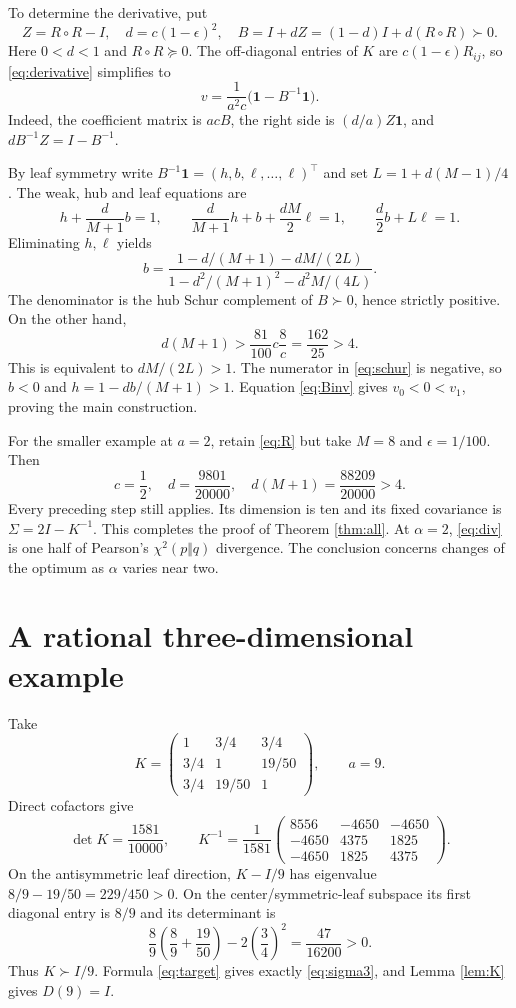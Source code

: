 \documentclass[11pt]{article}
\theoremstyle{remark}\newtheorem{remark}[theorem]{Remark}
\newcommand{\one}{\mathbf{1}}
\begin{document}
To determine the derivative, put
\[
 Z=R\circ R-I,\quad d=c(1-\epsilon)^2,\quad
 B=I+dZ=(1-d)I+d(R\circ R)\succ0.
\]
Here $0<d<1$ and $R\circ R\succeq0$. The off-diagonal entries of $K$
are $c(1-\epsilon)R_{ij}$, so \eqref{eq:derivative} simplifies to
\begin{equation}\label{eq:Binv}
 v=\frac1{a^2c}\bigl(\one-B^{-1}\one\bigr).
\end{equation}
Indeed, the coefficient matrix is $acB$, the right side is
$(d/a)Z\one$, and $dB^{-1}Z=I-B^{-1}$.

By leaf symmetry write
$B^{-1}\one=(h,b,\ell,\ldots,\ell)^\top$ and set
$L=1+d(M-1)/4$. The weak, hub and leaf equations are
\[
 h+\frac d{M+1}b=1,\qquad
 \frac d{M+1}h+b+\frac{dM}{2}\ell=1,\qquad
 \frac d2 b+L\ell=1.
\]
Eliminating $h,\ell$ yields
\begin{equation}\label{eq:schur}
 b=\frac{1-d/(M+1)-dM/(2L)}
          {1-d^2/(M+1)^2-d^2M/(4L)}.
\end{equation}
The denominator is the hub Schur complement of $B\succ0$, hence
strictly positive. On the other hand,
\[
 d(M+1)>\frac{81}{100}c\frac8c=\frac{162}{25}>4.
\]
This is equivalent to $dM/(2L)>1$. The numerator in
\eqref{eq:schur} is negative, so $b<0$ and
$h=1-db/(M+1)>1$. Equation \eqref{eq:Binv} gives
$v_0<0<v_1$, proving the main construction.

For the smaller example at $a=2$, retain \eqref{eq:R} but take
$M=8$ and $\epsilon=1/100$. Then
\[
 c=\frac12,\quad d=\frac{9801}{20000},\quad
 d(M+1)=\frac{88209}{20000}>4.
\]
Every preceding step still applies. Its dimension is ten and its
fixed covariance is $\Sigma=2I-K^{-1}$. This completes the proof of
Theorem \ref{thm:all}. At $\alpha=2$, \eqref{eq:div} is one half
of Pearson's $\chi^2(p\Vert q)$ divergence. The conclusion concerns
changes of the optimum as $\alpha$ varies near two.

\section{A rational three-dimensional example}
Take
\[
 K=\begin{pmatrix}
 1&3/4&3/4\\
 3/4&1&19/50\\
 3/4&19/50&1
 \end{pmatrix},\qquad a=9.
\]
Direct cofactors give
\[
 \det K=\frac{1581}{10000},\qquad
 K^{-1}=\frac1{1581}
 \begin{pmatrix}
 8556&-4650&-4650\\
 -4650&4375&1825\\
 -4650&1825&4375
 \end{pmatrix}.
\]
On the antisymmetric leaf direction, $K-I/9$ has eigenvalue
$8/9-19/50=229/450>0$. On the center/symmetric-leaf subspace its
first diagonal entry is $8/9$ and its determinant is
\[
 \frac89\left(\frac89+\frac{19}{50}\right)
 -2\left(\frac34\right)^2=\frac{47}{16200}>0.
\]
Thus $K\succ I/9$. Formula \eqref{eq:target} gives exactly
\eqref{eq:sigma3}, and Lemma \ref{lem:K} gives $D(9)=I$.
\end{document}
